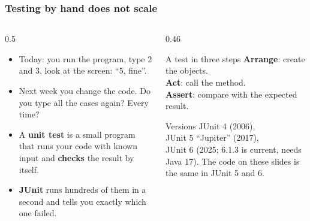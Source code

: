 \documentclass[aspectratio=169,10pt,compress]{beamer}
\begin{document}
\begin{frame}[t,fragile] \frametitle{Testing by hand does not scale}
  \begin{columns}[T]
    \begin{column}{0.5\textwidth}
      \begin{itemize}\small
        \item Today: you run the program, type 2 and 3, look at the screen: ``5, fine''.
        \item Next week you change the code. Do you type all the cases again? Every time?
        \item A \textbf{unit test} is a small program that runs your code with known input and
              \textbf{checks} the result by itself.
        \item \textbf{JUnit} runs hundreds of them in a second and tells you exactly which one failed.
      \end{itemize}
    \end{column}
    \begin{column}{0.46\textwidth}
      \begin{block}{A test in three steps}
        \small
        \textbf{Arrange}: create the objects.\\
        \textbf{Act}: call the method.\\
        \textbf{Assert}: compare with the expected result.
      \end{block}
      \begin{block}{Versions}
        \small 
        JUnit 4 (2006), \\
        JUnit 5 ``Jupiter'' (2017), \\
        JUnit 6 (2025; 6.1.3 is current, needs Java 17).
        The code on these slides is the same in JUnit 5 and 6.
      \end{block}
    \end{column}
  \end{columns}
\end{frame}

\end{document}
